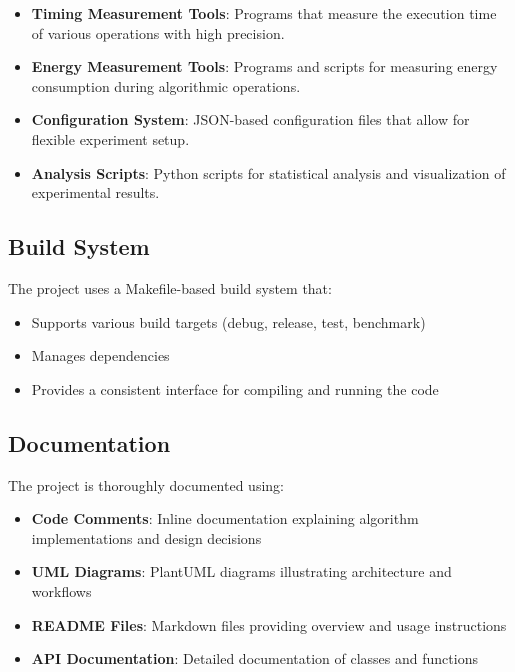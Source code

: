 \begin{itemize}
    \item \textbf{Timing Measurement Tools}: Programs that measure the execution time of various operations with high precision.
    
    \item \textbf{Energy Measurement Tools}: Programs and scripts for measuring energy consumption during algorithmic operations.
    
    \item \textbf{Configuration System}: JSON-based configuration files that allow for flexible experiment setup.
    
    \item \textbf{Analysis Scripts}: Python scripts for statistical analysis and visualization of experimental results.
\end{itemize}

\subsection{Build System}

The project uses a Makefile-based build system that:

\begin{itemize}
    \item Supports various build targets (debug, release, test, benchmark)
    \item Manages dependencies
    \item Provides a consistent interface for compiling and running the code
\end{itemize}

\subsection{Documentation}

The project is thoroughly documented using:

\begin{itemize}
    \item \textbf{Code Comments}: Inline documentation explaining algorithm implementations and design decisions
    
    \item \textbf{UML Diagrams}: PlantUML diagrams illustrating architecture and workflows
    
    \item \textbf{README Files}: Markdown files providing overview and usage instructions
    
    \item \textbf{API Documentation}: Detailed documentation of classes and functions
\end{itemize} 